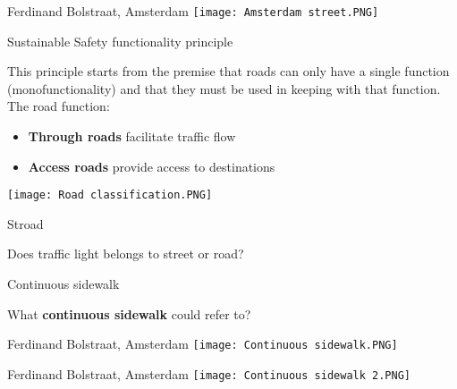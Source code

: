 \documentclass{beamer}
\begin{document}
    \begin{frame}{Ferdinand Bolstraat, Amsterdam}
        \texttt{[image: Amsterdam street.PNG]}
    \end{frame}

    \begin{frame}{Sustainable Safety functionality principle}
        \begin{block}{}
            This principle starts from the premise that roads can only have a single function (monofunctionality) and that they must be used in keeping with that function.
            The road function:\\
            \begin{itemize}
                \item \textbf{Through roads} facilitate traffic flow
                \item \textbf{Access roads} provide access to destinations
            \end{itemize}
        \end{block}
        \texttt{[image: Road classification.PNG]}
    \end{frame}

    \begin{frame}{Stroad}
        \begin{block}{}
            Does traffic light belongs to street or road?
        \end{block}
    \end{frame}

    \begin{frame}{Continuous sidewalk}
        \begin{block}{}
            What \textbf{continuous sidewalk} could refer to?
        \end{block}
    \end{frame}

    \begin{frame}{Ferdinand Bolstraat, Amsterdam}
        \texttt{[image: Continuous sidewalk.PNG]}
    \end{frame}

    \begin{frame}{Ferdinand Bolstraat, Amsterdam}
        \texttt{[image: Continuous sidewalk 2.PNG]}
    \end{frame}
\end{document}
